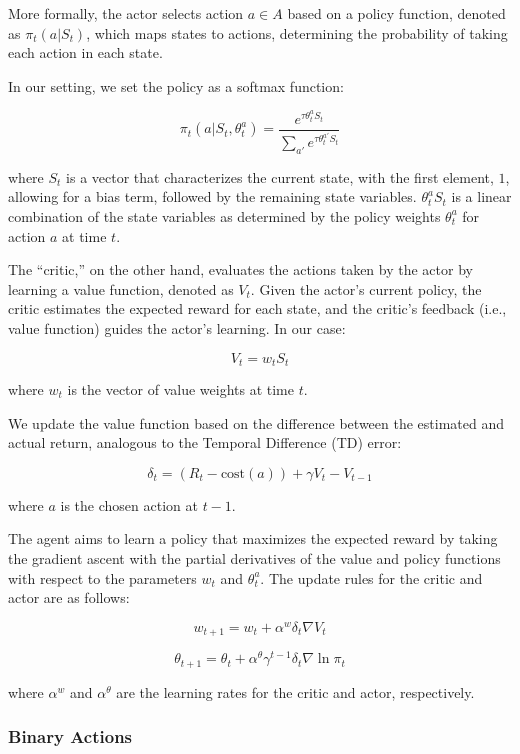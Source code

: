 \documentclass[
  number,
  preprint,
  3p,
  onecolumn]{elsarticle}
\begin{document}
More formally, the actor selects action \(a \in A\) based on a policy
function, denoted as \(\pi_t(a|S_t)\), which maps states to actions,
determining the probability of taking each action in each state.

In our setting, we set the policy as a softmax function:

\[
\pi_t(a|S_t,\theta^a_t) = \frac{e^{\tau \theta^a_t S_t}}{\sum_{a'} e^{\tau \theta^{a'}_t S_t}}
\]

where \(S_{t}\) is a vector that characterizes the current state, with
the first element, \(1\), allowing for a bias term, followed by the
remaining state variables. \(\theta^a_t S_t\) is a linear combination of
the state variables as determined by the policy weights \(\theta^a_t\)
for action \(a\) at time \(t\).

The ``critic,'' on the other hand, evaluates the actions taken by the
actor by learning a value function, denoted as \(V_t\). Given the
actor's current policy, the critic estimates the expected reward for
each state, and the critic's feedback (i.e., value function) guides the
actor's learning. In our case:

\[
V_t = w_t S_t
\]

where \(w_t\) is the vector of value weights at time \(t\).

We update the value function based on the difference between the
estimated and actual return, analogous to the Temporal Difference (TD)
error:

\[
\delta_t = (R_{t} - \text{cost}(a)) + \gamma V_t - V_{t-1}
\]

where \(a\) is the chosen action at \(t-1\).

The agent aims to learn a policy that maximizes the expected reward by
taking the gradient ascent with the partial derivatives of the value and
policy functions with respect to the parameters \(w_t\) and
\(\theta^a_t\). The update rules for the critic and actor are as
follows:

\[
w_{t+1} = w_{t} + \alpha^w \delta_t \nabla V_t
\]

\[
\theta_{t+1} = \theta_{t} + \alpha^{\theta} \gamma^{t-1} \delta_t \nabla \ln \pi_t
\]

where \(\alpha^w\) and \(\alpha^{\theta}\) are the learning rates for
the critic and actor, respectively.

\subsubsection{Binary Actions}\label{binary-actions-1}
\end{document}
